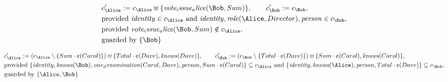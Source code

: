 \begin{align*}
&
c'_
{
\Alice
}
 := 
c_
{
\Alice
}
 \uplus 
\{
\mathit{
vote_issue_alice
}
(
\Bob
,
Sum
)
\}
, \qquad 
c'_
{
\Bob
}
 := 
c_
{
\Bob
}
,\\
&
\text{provided } 
\mathit{
identity
}
 \in c_
{
\Alice
}
 \text{ and } 
\mathit{
identity
}
,
\mathit{
role
}
(
\Alice
,
Director
)
,
\mathit{
person
}
 \in c_
{
\Bob
}
,\\
&
\text{provided } 
\mathit{
vote_issue_alice
}
(
\Bob
,
Sum
)
 \notin c_
{
\Alice
}
,\\
&
\text{guarded by } \{
\Bob
\}
\end{align*}

\begin{align*}
&
c'_
{
\Alice
}
 := 
(c_
{
\Alice
}
 \setminus 
\{
Sum
\cdot
\text{\textcent}
(
Carol
)
\}
) \uplus 
\{
Total
\cdot
\text{\textcent}
(
Dave
)
,
\mathit{
knows
}
(
Dave
)
\}
, \qquad 
c'_
{
\Bob
}
 := 
(c_
{
\Bob
}
 \setminus 
\{
Total
\cdot
\text{\textcent}
(
Dave
)
\}
) \uplus 
\{
Sum
\cdot
\text{\textcent}
(
Carol
)
,
\mathit{
knows
}
(
Carol
)
\}
,\\
&
\text{provided } 
\{
\mathit{
identity
}
,
\mathit{
knows
}
(
\Bob
)
,
\mathit{
one_denomination
}
(
Carol
,
Dave
)
,
\mathit{
person
}
,
Sum
\cdot
\text{\textcent}
(
Carol
)
\}
 \subseteq c_
{
\Alice
}
 \text{ and } 
\{
\mathit{
identity
}
,
\mathit{
knows
}
(
\Alice
)
,
\mathit{
person
}
,
Total
\cdot
\text{\textcent}
(
Dave
)
\}
 \subseteq c_
{
\Bob
}
,\\
&
\text{guarded by } \{
\Alice
,
\Bob
\}
\end{align*}

